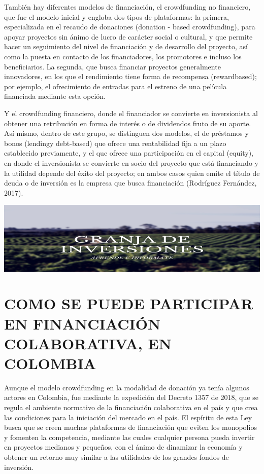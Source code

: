 \documentclass[
]{book}
\begin{document}
También hay diferentes modelos de financiación, el crowdfunding no financiero, que fue el modelo inicial y engloba dos tipos de plataformas: la primera, especializada en el recaudo de donaciones (donation - based crowdfunding), para apoyar proyectos sin ánimo de lucro de carácter social o cultural, y que permite hacer un seguimiento del nivel de financiación y de desarrollo del proyecto, así como la puesta en contacto de los financiadores, los promotores e incluso los beneficiarios. La segunda, que busca financiar proyectos generalmente innovadores, en los que el rendimiento tiene forma de recompensa (rewardbased); por ejemplo, el ofrecimiento de entradas para el estreno de una película financiada mediante esta opción.

Y el crowdfunding financiero, donde el financiador se convierte en inversionista al obtener una retribución en forma de interés o de dividendos fruto de su aporte. Así mismo, dentro de este grupo, se distinguen dos modelos, el de préstamos y bonos (lendingy debt-based) que ofrece una rentabilidad fija a un plazo establecido previamente, y el que ofrece una participación en el capital (equity), en donde el inversionista se convierte en socio del proyecto que está financiando y la utilidad depende del éxito del proyecto; en ambos casos quien emite el título de deuda o de inversión es la empresa que busca financiación (Rodríguez Fernández, 2017).

\includegraphics[width=1\linewidth,height=0.3\textheight]{imagenes/Granja1}

\hypertarget{como-se-puede-participar-en-financiaciuxf3n-colaborativa-en-colombia}{%
\chapter{COMO SE PUEDE PARTICIPAR EN FINANCIACIÓN COLABORATIVA, EN COLOMBIA}\label{como-se-puede-participar-en-financiaciuxf3n-colaborativa-en-colombia}}

Aunque el modelo crowdfunding en la modalidad de donación ya tenía algunos actores en Colombia, fue mediante la expedición del Decreto 1357 de 2018, que se regula el ambiente normativo de la financiación colaborativa en el país y que crea las condiciones para la iniciación del mercado en el país. El espíritu de esta Ley busca que se creen muchas plataformas de financiación que eviten los monopolios y fomenten la competencia, mediante las cuales cualquier persona pueda invertir en proyectos medianos y pequeños, con el ánimo de dinamizar la economía y obtener un retorno muy similar a las utilidades de los grandes fondos de inversión.
\end{document}
